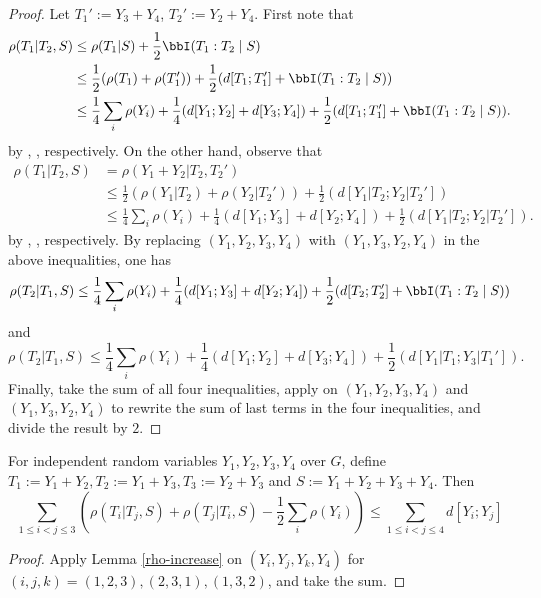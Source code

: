 \begin{proof}\leanok{}
  Let $T_1':=Y_3+Y_4$, $T_2':=Y_2+Y_4$.
  First note that
  \begin{align*}
    \rho(T_1|T_2,S)
    &\le \rho(T_1|S) + \frac{1}{2}\bbI(T_1:T_2\mid S)  \\
    &\le \frac{1}{2}(\rho(T_1)+\rho(T_1'))+\frac{1}{2}(d[T_1;T_1']+\bbI(T_1:T_2\mid S)) \\
    &\le \frac{1}{4} \sum_{i} \rho(Y_i) +\frac{1}{4}(d[Y_1;Y_2]+d[Y_3;Y_4]) + \frac{1}{2}(d[T_1;T_1']+\bbI(T_1:T_2\mid S)).
  \end{align*}
  by , ,  respectively.
  On the other hand, observe that
  \begin{align*}
    \rho(T_1|T_2,S)
    &=\rho(Y_1+Y_2|T_2,T_2') \\
    &\le \frac{1}{2}(\rho(Y_1|T_2)+\rho(Y_2|T_2'))+\frac{1}{2}(d[Y_1|T_2;Y_2|T_2'])  \\
    &\le \frac{1}{4} \sum_{i} \rho(Y_i) +\frac{1}{4}(d[Y_1;Y_3]+d[Y_2;Y_4]) + \frac{1}{2}(d[Y_1|T_2;Y_2|T_2']).
  \end{align*}
  by , ,  respectively.
  By replacing $(Y_1,Y_2,Y_3,Y_4)$ with $(Y_1,Y_3,Y_2,Y_4)$ in the above inequalities, one has
  $$\rho(T_2|T_1,S) \le \frac{1}{4} \sum_{i} \rho(Y_i) +\frac{1}{4}(d[Y_1;Y_3]+d[Y_2;Y_4]) + \frac{1}{2}(d[T_2;T_2']+\bbI(T_1:T_2\mid S))$$
  and
  $$\rho(T_2|T_1,S) \le \frac{1}{4} \sum_{i} \rho(Y_i) +\frac{1}{4}(d[Y_1;Y_2]+d[Y_3;Y_4]) + \frac{1}{2}(d[Y_1|T_1;Y_3|T_1']).$$
  Finally, take the sum of all four inequalities, apply  on $(Y_1,Y_2,Y_3,Y_4)$ and $(Y_1,Y_3,Y_2,Y_4)$ to rewrite the sum of last terms in the four inequalities, and divide the result by $2$.
\end{proof}

\begin{lemma}\label{rho-increase-symmetrized}\leanok
  For independent random variables $Y_1,Y_2,Y_3,Y_4$ over $G$, define $T_1:=Y_1+Y_2,T_2:=Y_1+Y_3,T_3:=Y_2+Y_3$ and $S:=Y_1+Y_2+Y_3+Y_4$. Then
  $$\sum_{1 \leq i<j \leq 3} (\rho(T_i|T_j,S) + \rho(T_j|T_i,S) -  \frac{1}{2}\sum_{i} \rho(Y_i))\le \sum_{1\leq i < j \leq 4}d[Y_i;Y_j]$$
\end{lemma}

\begin{proof}\leanok
  Apply Lemma \ref{rho-increase} on $(Y_i,Y_j,Y_k,Y_4)$ for $(i,j,k)=(1,2,3),(2,3,1),(1,3,2)$, and take the sum.
\end{proof}


